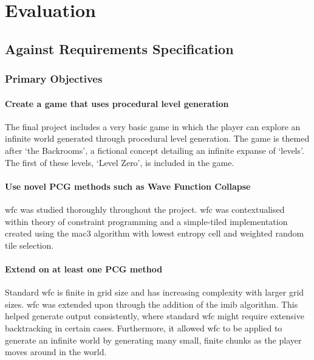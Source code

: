 \chapter{Evaluation}

\section{Against Requirements Specification}
\subsection{Primary Objectives}
\subsubsection{Create a game that uses procedural level generation}
The final project includes a very basic game in which the player can explore an infinite world generated through procedural level generation. The game is themed after `the Backrooms', a fictional concept detailing an infinite expanse of `levels'. The first of these levels, `Level Zero', is included in the game.

\subsubsection{Use novel PCG methods such as Wave Function Collapse}
\acrlong{wfc} was studied thoroughly throughout the project. \acrshort{wfc} was contextualised within theory of constraint programming and a simple-tiled implementation created using the \acrshort{mac3} algorithm with lowest entropy cell and weighted random tile selection.

\subsubsection{Extend on at least one PCG method}
Standard \acrlong{wfc} is finite in grid size and has increasing complexity with larger grid sizes. \acrshort{wfc} was extended upon through the addition of the \acrlong{imib} algorithm. This helped generate output consistently, where standard \acrshort{wfc} might require extensive backtracking in certain cases. Furthermore, it allowed \acrshort{wfc} to be applied to generate an infinite world by generating many small, finite chunks as the player moves around in the world.

